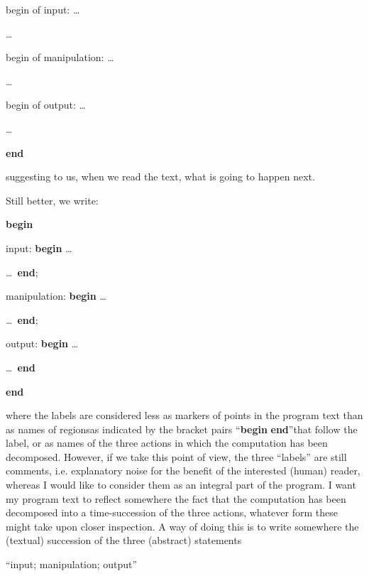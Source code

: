 \documentclass[twoside,11pt]{book}
\begin{document}
\noindent
begin of input:\tabto{10em} \quad\dots
\nopagebreak

\noindent
\tabto{10em} \quad\dots

\noindent
begin of manipulation:\tabto{10em} \quad\dots
\nopagebreak

\noindent
\tabto{10em} \quad\dots

\noindent
begin of output:\tabto{10em} \quad\dots
\nopagebreak

\noindent
\tabto{10em} \quad\dots

\noindent
\tabto{10em}\textbf{end}

\noindent
suggesting to us, when we read the text, what is going to happen next.

Still better, we write:

\noindent
\tabto{10em}\textbf{begin}
\nopagebreak

\noindent
input:\tabto{10em} \quad\textbf{begin} \tabto{14em}\dots
\nopagebreak

\noindent
\tabto{13em} \quad\dots\ \textbf{end};

\noindent
manipulation:\tabto{10em} \quad\textbf{begin} \tabto{14em}\dots
\nopagebreak

\noindent
\tabto{13em} \quad\dots\ \textbf{end};

\noindent
output:\tabto{10em} \quad\textbf{begin} \tabto{14em}\dots
\nopagebreak
\nopagebreak

\noindent
\tabto{13em} \quad\dots\ \textbf{end}
\nopagebreak

\noindent
\tabto{10em}\textbf{end}

\noindent
where the labels are considered less as markers of points in the program text than as names of regions\textemdash{}as indicated by the bracket pairs ``\textbf{begin} \textendash  \textbf{end}''\textemdash{}that follow the label, or as names of the three actions in which the computation has been decomposed. However, if we take this point of view, the three ``labels'' are still comments, i.e. explanatory noise for the benefit of the interested (human) reader, whereas I would like to consider them as an integral part of the program. I want my program text to reflect somewhere the fact that the computation has been decomposed into a time-succession of the three actions, whatever form these might take upon closer inspection. A way of doing this is to write somewhere the (textual) succession of the three (abstract) statements
\medskip

{
	\setlength{\parindent}{8em}
	\hspace{-.4em}``input; manipulation; output''
}
\medskip
\end{document}
